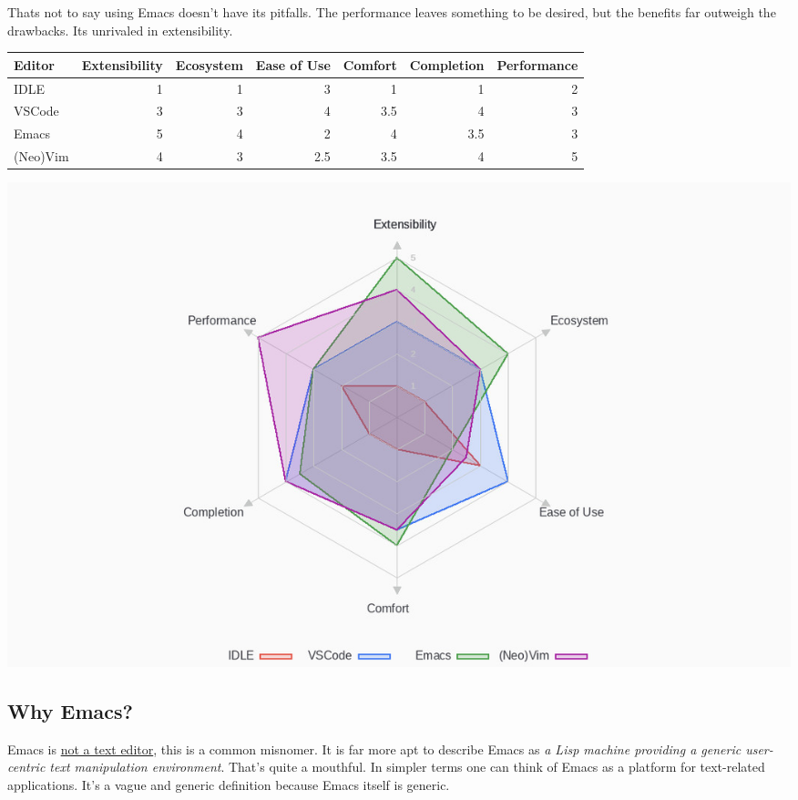\documentclass{scrartcl}
\begin{document}
Thats not to say using Emacs doesn't have its pitfalls. The performance leaves
something to be desired, but the benefits far outweigh the drawbacks. Its
unrivaled in extensibility.

\begin{center}
\begin{tabular}{lrrrrrr}
\toprule
Editor & Extensibility & Ecosystem & Ease of Use & Comfort & Completion & Performance\\
\midrule
IDLE & 1 & 1 & 3 & 1 & 1 & 2\\
VSCode & 3 & 3 & 4 & 3.5 & 4 & 3\\
Emacs & 5 & 4 & 2 & 4 & 3.5 & 3\\
(Neo)Vim & 4 & 3 & 2.5 & 3.5 & 4 & 5\\
\bottomrule
\end{tabular}
\end{center}

\begin{center}
\includegraphics[width=.9\linewidth]{./misc/editor-comparison.jpeg}
\end{center}
\subsection{Why Emacs?}
\label{sec:org935a8ff}
Emacs is \href{https://www.eigenbahn.com/2020/01/12/emacs-is-no-editor}{not a text editor}, this is a common misnomer. It is far more apt to
describe Emacs as \emph{a Lisp machine providing a generic user-centric text
manipulation environment}. That's quite a mouthful.
In simpler terms one can think of Emacs as a platform for text-related
applications. It's a vague and generic definition because Emacs itself is
generic.
\end{document}
